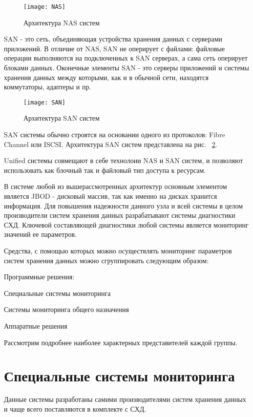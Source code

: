 \begin{figure}[!h]
	\centering
	\texttt{[image: NAS]}
	\caption{Архитектура NAS систем}
	\label{fig:NAS}
\end{figure}
  
SAN - это сеть, объединяющая устройства хранения данных с серверами приложений. В отличие от NAS, SAN не оперирует с файлами: файловые операции выполняются на подключенных к SAN серверах, а сама сеть оперирует блоками данных. Оконечные элементы SAN - это серверы приложений и системы хранения данных между которыми, как и в обычной сети, находятся коммутаторы, адаптеры и пр.

\begin{figure}[!h]
	\centering
	\texttt{[image: SAN]}
	\caption{Архитектура SAN систем}
	\label{fig:SAN}
\end{figure}

SAN системы обычно строятся на основании одного из протоколов: Fibre Channel или ISCSI. Архитектура SAN систем представлена на рис. ~\ref{fig:SAN}.

Unified системы совмещают в себе технолоии NAS и SAN систем, и позволяют использовать как блочный так и файловый тип доступа к ресурсам. 

В системе любой из вышерассмотренных архитектур основным элементом является JBOD - дисковый массив, так как именно на дисках хранится информация. Для повышения надежности данного узла и всей системы в целом производители систем хранения данных разрабатывают системы диагностики СХД. Ключевой составляющей диагностики любой системы является мониторинг значений ее параметров. 

Средства, с помощью которых можно осуществлять мониторинг параметров систем хранения данных можно сгруппировать следующим образом:
\begin{itemize*}
	\item{Программные решения:}
	\begin{itemize*}
		\item{Специальные системы мониторинга}
		\item{Системы мониторинга общего назначения}
	\end{itemize*}
	\item{Аппаратные решения}
\end{itemize*}

Рассмотрим подробнее наиболее характерных представителей каждой группы.
 
\section{Специальные системы мониторинга}
Данные системы разработаны самими  производителями систем хранения данных и чаще всего поставляются в комплекте с СХД.

